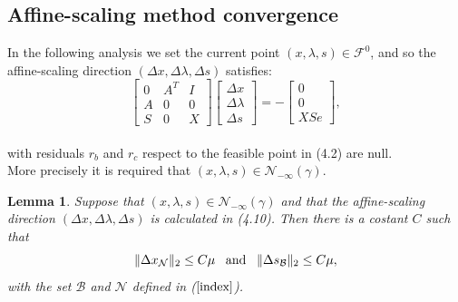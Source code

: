 \documentclass[a4paper,10 pt,titlepage,twoside]{report}
\theoremstyle{plain}
\newtheorem{lem}[thm]{Lemma}
\theoremstyle{definition}
\theoremstyle{remark}
\begin{document}
\subsection{Affine-scaling method convergence}
In the following analysis we set the current point $(x, \lambda, s)\in\mathcal{F}^{0}$, and so the affine-scaling direction $(\Delta x, \Delta \lambda, \Delta s)$ satisfies:\\
\begin{equation}\label{5.1}\tag{4.10}
\begin{bmatrix}
0&A^{T}&I \\A&0&0\\S&0&X
\end{bmatrix}\begin{bmatrix}
\Delta x\\\Delta\lambda \\\Delta s
\end{bmatrix}=-\begin{bmatrix}
0\\0\\XSe
\end{bmatrix},
\end{equation}\\
with residuals $r_{b}$ and $r_{c}$ respect to the feasible point in (4.2) are null.\\More precisely it is required that $(x, \lambda, s)\in\mathcal{N}_{- \infty}(\gamma)$.
\begin{lem}
	Suppose that $(x, \lambda, s)\in\mathcal{N}_{- \infty}(\gamma)$ and that the affine-scaling direction $(\Delta x,\Delta \lambda, \Delta s)$ is calculated in (4.10). Then there is a costant $C$ such that
	\begin{equation*}
	\lVert \Delta x_{\mathcal{N}} \rVert_{2} \leq C \mu \text{\;\;\;and\;\;\;} \lVert \Delta s_\mathcal{B} \rVert_{2} \leq C \mu,
	\end{equation*}
	with the set $\mathcal{B}$ and  $\mathcal{N}$ defined in ($\ref{index}$). 
\end{lem}
\end{document}
